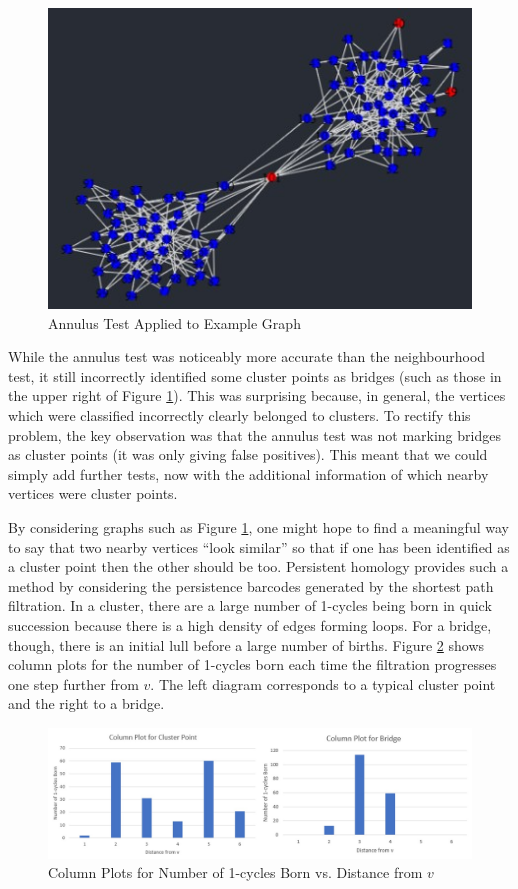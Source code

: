 \documentclass[12pt,a4paper]{amsart}
\numberwithin{equation}{section}
\theoremstyle{plain}
\theoremstyle{definition}
\begin{document}
\begin{figure}[h]
	\centering
	\includegraphics[scale=1]{AnnulusTest.jpg}
	\caption{Annulus Test Applied to Example Graph}
	\label{annulTest}
\end{figure}

While the annulus test was noticeably more accurate than the neighbourhood test, it still incorrectly identified some cluster points as bridges (such as those in the upper right of Figure \ref{annulTest}). This was surprising because, in general, the vertices which were classified incorrectly clearly belonged to clusters. To rectify this problem, the key observation was that the annulus test was not marking bridges as cluster points (it was only giving false positives). This meant that we could simply add further tests, now with the additional information of which nearby vertices were cluster points. 

By considering graphs such as Figure \ref{annulTest}, one might hope to find a meaningful way to say that two nearby vertices ``look similar'' so that if one has been identified as a cluster point then the other should be too. Persistent homology provides such a method by considering the persistence barcodes generated by the shortest path filtration. In a cluster, there are a large number of 1-cycles being born in quick succession because there is a high density of edges forming loops. For a bridge, though, there is an initial lull before a large number of births. Figure \ref{columnPlots} shows column plots for the number of 1-cycles born each time the filtration progresses one step further from $v$. The left diagram corresponds to a typical cluster point and the right to a bridge.

\begin{figure}[h]
	\centering
	\includegraphics[scale=0.65]{ColumnPlots.jpg}
	\caption{Column Plots for Number of 1-cycles Born vs. Distance from $v$}
	\label{columnPlots}
\end{figure}
\end{document}
